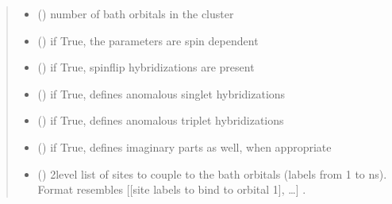 \documentclass[letterpaper,10pt,english]{sphinxmanual}
\begin{document}
\begin{fulllineitems}
\begin{fulllineitems}
\begin{quote}
\begin{description}
\begin{itemize}
\item {} 
\sphinxAtStartPar
{} () \textendash{} number of bath orbitals in the cluster

\item {} 
\sphinxAtStartPar
{} () \textendash{} if True, the parameters are spin dependent

\item {} 
\sphinxAtStartPar
{} () \textendash{} if True, spin\sphinxhyphen{}flip hybridizations are present

\item {} 
\sphinxAtStartPar
{} () \textendash{} if True, defines anomalous singlet hybridizations

\item {} 
\sphinxAtStartPar
{} () \textendash{} if True, defines anomalous triplet hybridizations

\item {} 
\sphinxAtStartPar
{} () \textendash{} if True, defines imaginary parts as well, when appropriate

\item {} 
\sphinxAtStartPar
{} (\sphinxstyleliteralemphasis{\sphinxupquote{{[}}}\sphinxstyleliteralemphasis{\sphinxupquote{{[}}}\sphinxstyleliteralemphasis{\sphinxupquote{{]}}}\sphinxstyleliteralemphasis{\sphinxupquote{{]}}}) \textendash{} 2\sphinxhyphen{}level list of sites to couple to the bath orbitals (labels from 1 to ns). Format resembles {[}{[}site labels to bind to orbital 1{]}, …{]} .

\end{itemize}

\end{description}\end{quote}


\end{fulllineitems}
\end{fulllineitems}
\end{document}
